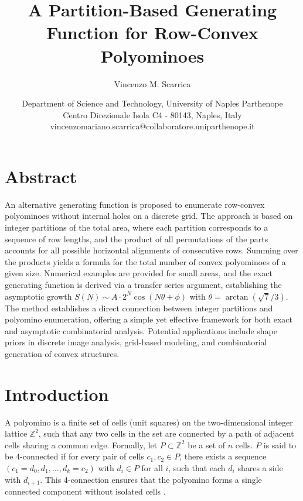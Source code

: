 \documentclass{article}
\title{A Partition-Based Generating Function for Row-Convex Polyominoes}
\author{Vincenzo M. Scarrica}
\date{Department of Science and Technology, University of Naples Parthenope\\ 
Centro Direzionale Isola C4 - 80143, Naples, Italy\\ 
vincenzomariano.scarrica@collaboratore.uniparthenope.it}
\theoremstyle{definition}
\theoremstyle{plain}
\begin{document}
\maketitle

\section{Abstract}

An alternative generating function is proposed to enumerate row-convex 
polyominoes without internal holes on a discrete grid. The approach is 
based on integer partitions of the total area, where each partition 
corresponds to a sequence of row lengths, and the product of all 
permutations of the parts accounts for all possible horizontal alignments 
of consecutive rows. Summing over the products yields a formula for the 
total number of convex polyominoes of a given size. Numerical examples 
are provided for small areas, and the exact generating function is derived 
via a transfer series argument, establishing the asymptotic growth 
$S(N) \sim A \cdot 2^N \cos(N\theta + \phi)$ with 
$\theta = \arctan(\sqrt{7}/3)$. The method establishes a direct connection 
between integer partitions and polyomino enumeration, offering a simple 
yet effective framework for both exact and asymptotic combinatorial 
analysis. Potential applications include shape priors in discrete image 
analysis, grid-based modeling, and combinatorial generation of convex 
structures.

\section{Introduction}

A polyomino is a finite set of cells (unit squares) on the two-dimensional 
integer lattice $\mathbb{Z}^2$, such that any two cells in the set are 
connected by a path of adjacent cells sharing a common edge. Formally, 
let $P \subset \mathbb{Z}^2$ be a set of $n$ cells. $P$ is said to be 
4-connected if for every pair of cells $c_1, c_2 \in P$, there exists a 
sequence $(c_1 = d_0, d_1, \dots, d_k = c_2)$ with $d_i \in P$ for all 
$i$, such that each $d_i$ shares a side with $d_{i+1}$. This 4-connection 
ensures that the polyomino forms a single connected component without 
isolated cells \cite{golomb1954checker}.
\end{document}
